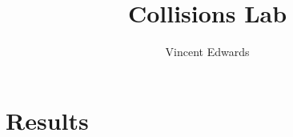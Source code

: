 \documentclass[12pt]{iopart} %
\title{Collisions Lab}
\author{Vincent Edwards}
\begin{document}
\section{Results}
\end{document}
